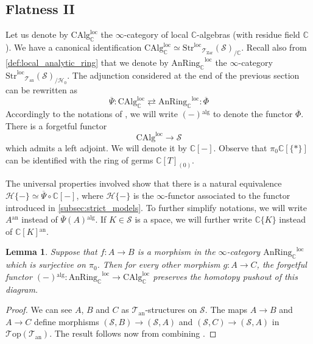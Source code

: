 \documentclass[12pt,a4paper,reqno]{amsart}
\theoremstyle{plain}
\newtheorem{lem}[thm]{Lemma}
\theoremstyle{definition}
\theoremstyle{remark}
\numberwithin{equation}{section}
\begin{document}
{\ignorespaces}
	
\subsection{Flatness II}
	
Let us denote by $\mathrm{CAlg}_{\mathbb C}^{\mathrm{loc}}$ the $\infty$-category of local $\mathbb C$-algebras (with residue field $\mathbb C$).
We have a canonical identification $\mathrm{CAlg}_{\mathbb C}^{\mathrm{loc}} \simeq {\mathrm{Str}^\mathrm{loc}}_{{\mathcal T}_{\mathrm{Zar}}}({\mathcal S})_{/ \mathbb C}$.
Recall also from \cref{def:local_analytic_ring} that we denote by ${\mathrm{AnRing}_{\mathbb C}}^{\mathrm{loc}}$ the $\infty$-category ${\mathrm{Str}^\mathrm{loc}}_{{\mathcal T}_{\mathrm{an}}}({\mathcal S})_{/{\mathcal H}_0}$.
The adjunction considered at the end of the previous section can be rewritten as
\[ \overline{\Psi} \colon \mathrm{CAlg}_{\mathbb C}^{\mathrm{loc}} \rightleftarrows {\mathrm{AnRing}_{\mathbb C}}^{\mathrm{loc}} \colon \overline{\Phi} \]
Accordingly to the notations of \cite{DAG-IX}, we will write $(-){^\mathrm{alg}}$ to denote the functor $\overline{\Phi}$.
There is a forgetful functor
\[ \mathrm{CAlg}^{\mathrm{loc}} \to {\mathcal S} \]
which admits a left adjoint. We will denote it by $\mathbb C[-]$.
Observe that $\pi_0 \mathbb C[\{*\}]$ can be identified with the ring of germs $\mathbb C[T]_{(0)}$.

The universal properties involved show that there is a natural equivalence ${\mathcal H}\{-\} \simeq \overline{\Psi} \circ \mathbb C[-]$, where ${\mathcal H}\{-\}$ is the $\infty$-functor associated to the functor introduced in \cref{subsec:strict_models}.
To further simplify notations, we will write $A{^\mathrm{an}}$ instead of $\overline{\Psi}(A){^\mathrm{alg}}$.
If $K \in {\mathcal S}$ is a space, we will further write $\mathbb C\{K\}$ instead of $\mathbb C[K]{^\mathrm{an}}$.
	
\begin{lem} \label{lem:surjective_on_pi_0_argument}
	Suppose that $f \colon A \to B$ is a morphism in the $\infty$-category ${\mathrm{AnRing}_{\mathbb C}}^{\mathrm{loc}}$ which is surjective on $\pi_0$.
	Then for every other morphism $g \colon A \to C$, the forgetful functor $(-){^\mathrm{alg}} \colon {\mathrm{AnRing}_{\mathbb C}}^{\mathrm{loc}} \to \mathrm{CAlg}^{\mathrm{loc}}_{\mathbb C}$ preserves the homotopy pushout of this diagram.
\end{lem}
	
\begin{proof}
	We can see $A$, $B$ and $C$ as ${{\mathcal T}_{\mathrm{an}}}$-structures on ${\mathcal S}$.
	The maps $A \to B$ and $A \to C$ define morphisms $({\mathcal S}, B) \to ({\mathcal S}, A)$ and $({\mathcal S}, C) \to ({\mathcal S}, A)$ in ${\mathcal T\mathrm{op}}({{\mathcal T}_{\mathrm{an}}})$.
	The result follows now from combining \cite[Proposition 10.3, Lemma 11.10]{DAG-IX}.
\end{proof}
	
\end{document}

